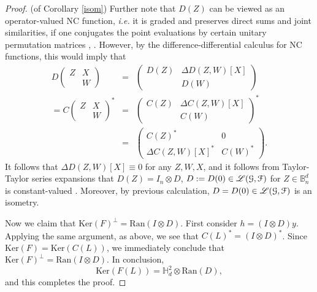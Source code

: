 \documentclass[11pt]{article}
\newcommand{\ba}{\begin{eqnarray}}
\newcommand{\ea}{\end{eqnarray}}
\newcommand{\bpm}{\begin{pmatrix}}
\newcommand{\epm}{\end{pmatrix}}
\newcommand{\nn}{\nonumber}
\newcommand{\scr}{\ensuremath{\mathscr}}
\newcommand{\mc}{\ensuremath{\mathcal}}
\def\B{\mathbb{B}}
\def\bH{\mathbb{H}}
\newcommand{\ran}[1]{\ensuremath{\mathrm{Ran} \left( {#1} \right) }}
\renewcommand{\ker}[1]{\ensuremath{\mathrm{Ker} \left( {#1} \right) }}
\numberwithin{equation}{section}
\numberwithin{subsection}{section}
\theoremstyle{definition}
\begin{document}
\begin{proof}{ (of Corollary \ref{isom})}
Further note that $D (Z)$ can be viewed as an operator-valued NC function, \emph{i.e.} it is graded and preserves direct sums and joint similarities, if one conjugates the point evaluations by certain unitary permutation matrices \cite[pp. 65--66]{KVV-rational2}, \cite[p.38]{PV-realize}. However, by the difference-differential calculus for NC functions, this would imply that 
\ba D \bpm Z & X \\ & W \epm  & = & \bpm D(Z) & \Delta D (Z,W) [X]  \\ & D(W) \epm \nn \\
 =  C \bpm Z & X \\ & W \epm ^* & = &  \bpm C(Z) & \Delta C (Z,W) [X]  \\ & C(W) \epm ^* \nn \\
& = & \bpm C(Z) ^* & 0 \\ \Delta C (Z,W) [X] ^* & C(W) ^* \epm. \nn \ea It follows that $\Delta D (Z,W) [X ] \equiv 0$ for any $Z,W, X$, and it follows from Taylor-Taylor series expansions that $D (Z) = I_n \otimes D$, $D := D(0) \in \scr{L} (\mc{G} , \mc{F} )$ for $Z \in \B ^d _n$ is constant-valued \cite[Chapter 7]{KVV}. Moreover, by previous calculation, $D = D(0) \in \scr{L} (\mc{G} , \mc{F} )$ is an isometry.

Now we claim that $\ker{F} ^\perp = \ran{I \otimes D }$. First consider $h= (I \otimes D) y$. Applying the same argument, as above, we see that $C(L)^* = (I \otimes D)^*$. Since $\ker{F} = \ker{C(L)}$, we immediately conclude that $\ker{F} ^\perp = \ran{I \otimes D }$. In conclusion, 
$$ \ker{F (L) } = \bH ^2 _d \otimes \ran{D}, $$ and this completes the proof. 


\end{proof}
\end{document}
